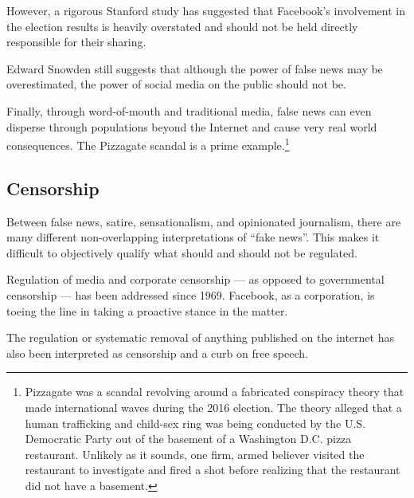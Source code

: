 \par However, a rigorous Stanford study has suggested that Facebook's involvement in the election results is heavily overstated and should not be held directly responsible for their sharing. \cite{stanford_election}

\par Edward Snowden still suggests that although the power of false news may be overestimated, the power of social media on the public should not be. \cite{tc_snowden}
\par Finally, through word-of-mouth and traditional media, false news can even disperse through populations beyond the Internet and cause very real world consequences. The Pizzagate scandal is a prime example.\footnote{Pizzagate was a scandal revolving around a fabricated conspiracy theory that made international waves during the 2016 election. The theory alleged that a human trafficking and child-sex ring was being conducted by the U.S. Democratic Party out of the basement of a Washington D.C. pizza restaurant. Unlikely as it sounds, one firm, armed believer visited the restaurant to investigate and fired a shot before realizing that the restaurant did not have a basement.\cite{ny_pizzagate}} \cite{cbs_fn}

\vfill

\subsection{Censorship}

\par Between false news, satire, sensationalism, and opinionated journalism, there are many different non-overlapping interpretations of ``fake news''. \cite{npr_fn} This makes it difficult to objectively qualify what should and should not be regulated.

\par Regulation of media and corporate censorship --- as opposed to governmental censorship --- has been addressed since 1969. \cite{silent_screen} Facebook, as a corporation, is toeing the line in taking a proactive stance in the matter.

\par The regulation or systematic removal of anything published on the internet has also been interpreted as censorship and a curb on free speech. \cite{eff_bill}

